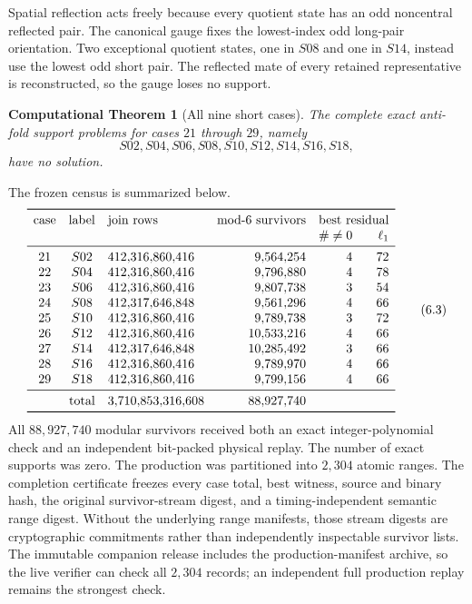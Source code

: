 \documentclass[11pt]{article}
\newtheorem{computationaltheorem}[theorem]{Computational Theorem}
\theoremstyle{remark}
\begin{document}
Spatial reflection acts freely because every quotient state has an odd
noncentral reflected pair.  The canonical gauge fixes the lowest-index odd
long-pair orientation.  Two exceptional quotient states, one in $S08$ and
one in $S14$, instead use the lowest odd short pair.  The reflected mate of
every retained representative is reconstructed, so the gauge loses no
support.

\begin{computationaltheorem}[All nine short cases]
\label{thm:short}
The complete exact anti-fold support problems for cases $21$ through $29$,
namely
\[
 S02,S04,S06,S08,S10,S12,S14,S16,S18,
\]
have no solution.
\end{computationaltheorem}

The frozen census is summarized below.
\[
\begin{array}{cclrrr}
\toprule
\text{case}&\text{label}&\text{join rows}&
\text{mod-6 survivors}&\multicolumn{2}{c}{\text{best residual}}\\
&&&&\#\ne0&\ell_1\\
\midrule
21&S02&412{,}316{,}860{,}416& 9{,}564{,}254&4&72\\
22&S04&412{,}316{,}860{,}416& 9{,}796{,}880&4&78\\
23&S06&412{,}316{,}860{,}416& 9{,}807{,}738&3&54\\
24&S08&412{,}317{,}646{,}848& 9{,}561{,}296&4&66\\
25&S10&412{,}316{,}860{,}416& 9{,}789{,}738&3&72\\
26&S12&412{,}316{,}860{,}416&10{,}533{,}216&4&66\\
27&S14&412{,}317{,}646{,}848&10{,}285{,}492&3&66\\
28&S16&412{,}316{,}860{,}416& 9{,}789{,}970&4&66\\
29&S18&412{,}316{,}860{,}416& 9{,}799{,}156&4&66\\
\midrule
\multicolumn{2}{r}{\text{total}}&
3{,}710{,}853{,}316{,}608&
88{,}927{,}740&&\\
\bottomrule
\end{array}                                           \tag{6.3}
\]
All $88{,}927{,}740$ modular survivors received both an exact
integer-polynomial check and an independent bit-packed physical replay.
The number of exact supports was zero.  The production was partitioned
into $2{,}304$ atomic ranges.  The completion certificate freezes every
case total, best witness, source and binary hash, the original
survivor-stream digest, and a timing-independent semantic range digest.
Without the underlying range manifests, those stream digests are
cryptographic commitments rather than independently inspectable survivor
lists.  The immutable companion release includes the production-manifest
archive, so the live verifier can check all $2{,}304$ records; an
independent full production replay remains the strongest check.
\end{document}
